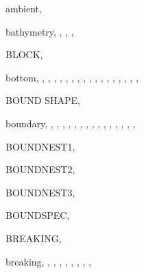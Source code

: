 \documentclass[12pt]{book}
\begin{document}
\begin{theindex}
  \item ambient, 

  \indexspace

  \item bathymetry, , , , 
  \item BLOCK, 
  \item bottom, , , , 
		, , , 
		, , , 
		, , , 
		, , , 
		, , 
  \item BOUND SHAPE, 
  \item boundary, , , , 
		, , , 
		, , , 
		, , , 
		, , , 
  \item BOUNDNEST1, 
  \item BOUNDNEST2, 
  \item BOUNDNEST3, 
  \item BOUNDSPEC, 
  \item BREAKING, 
  \item breaking, , , , 
		, , , 
		, , 

  \indexspace


\end{theindex}
\end{document}

